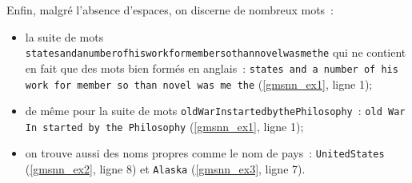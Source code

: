 Enfin, malgré l'absence d'espaces, on discerne de nombreux mots~:
\begin{itemize}
\item la suite de mots \lstinline!statesandanumberofhisworkformembersothannovelwasmethe! qui ne contient en fait que des mots bien formés en anglais~: \lstinline!states and a number of his work for member so than novel was me the! (\autoref{gmsnn_ex1}, ligne 1);
\item de même pour la suite de mots \lstinline!oldWarInstartedbythePhilosophy!~: \lstinline!old War In started by the Philosophy! (\autoref{gmsnn_ex1}, ligne 1);
\item on trouve aussi des noms propres comme le nom de pays~: \lstinline!UnitedStates! (\autoref{gmsnn_ex2}, ligne 8) et \lstinline!Alaska! (\autoref{gmsnn_ex3}, ligne 7).
\end{itemize}